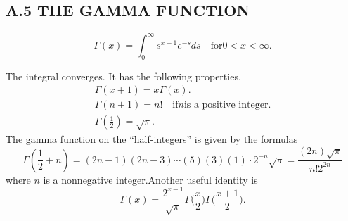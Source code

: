 \documentclass[hazy,blue,11pt]{elegantnote}
\begin{document}
\subsection{A.5 THE GAMMA FUNCTION}
\begin{definition}
\begin{equation}
    \Gamma(x)=\int_0^\infty s^{x-1}e^{-s}ds\quad\text{for}0<x<\infty.
\end{equation}   
\end{definition}
The integral converges. It has the following properties.
\begin{equation}
\begin{gathered}
\Gamma(x+1) =x\Gamma(x).  \\
\Gamma(n+1) =n!\quad\text{if}n\text{is a positive integer.}  \\
\Gamma\left(\frac{1}{2}\right) =\sqrt{\pi}\text{.}  
\end{gathered}
\end{equation}
The gamma function on the “half-integers” is given by the formulas
\begin{equation}
   \Gamma\left(\frac{1}{2}+n\right)=(2n-1)(2n-3)\cdots(5)(3)(1)\cdot2^{-n}\sqrt{\pi}=\frac{(2n)\sqrt{\pi}}{n!2^{2n}} 
\end{equation}
where $n$ is a nonnegative integer.Another useful identity is
\begin{equation}
   \Gamma(x)=\frac{2^{x-1}}{\sqrt{\pi}}\Gamma\bigg(\frac{x}{2}\bigg)\Gamma\bigg(\frac{x+1}{2}\bigg). 
\end{equation}


\nocite{*}
\printbibliography[heading=bibintoc, title=\ebibname]
\end{document}
